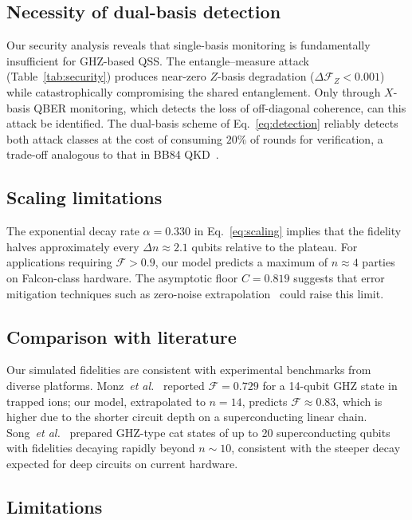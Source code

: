 \documentclass[aip, amsmath, amssymb, preprint, longbibliography]{revtex4-2}
\newcommand{\fid}{\mathcal{F}}
\begin{document}
\subsection{Necessity of dual-basis detection}

Our security analysis reveals that single-basis monitoring is
fundamentally insufficient for GHZ-based QSS. The entangle--measure
attack (Table~\ref{tab:security}) produces near-zero $Z$-basis
degradation ($\Delta\fid_Z<0.001$) while catastrophically compromising
the shared entanglement. Only through $X$-basis QBER monitoring, which
detects the loss of off-diagonal coherence, can this attack be identified.
The dual-basis scheme of Eq.~\eqref{eq:detection} reliably detects both
attack classes at the cost of consuming $20\%$ of rounds for
verification, a trade-off analogous to that in BB84
QKD~\cite{Bennett1984}.

\subsection{Scaling limitations}

The exponential decay rate $\alpha=0.330$ in Eq.~\eqref{eq:scaling}
implies that the fidelity halves approximately every $\Delta n\approx2.1$
qubits relative to the plateau. For applications requiring
$\fid>0.9$, our model predicts a maximum of $n\approx4$ parties on
Falcon-class hardware. The asymptotic floor $C=0.819$ suggests that
error mitigation techniques such as zero-noise
extrapolation~\cite{Temme2017} could raise this limit.

\subsection{Comparison with literature}

Our simulated fidelities are consistent with experimental benchmarks from
diverse platforms. Monz~\textit{et al.}~\cite{Monz2011} reported
$\fid=0.729$ for a 14-qubit GHZ state in trapped ions; our model,
extrapolated to $n=14$, predicts $\fid\approx0.83$, which is higher due
to the shorter circuit depth on a superconducting linear chain.
Song~\textit{et al.}~\cite{Song2019} prepared GHZ-type cat states of up
to 20 superconducting qubits with fidelities decaying rapidly beyond
$n\sim10$, consistent with the steeper decay expected for
deep circuits on current hardware.

\subsection{Limitations}
\end{document}
